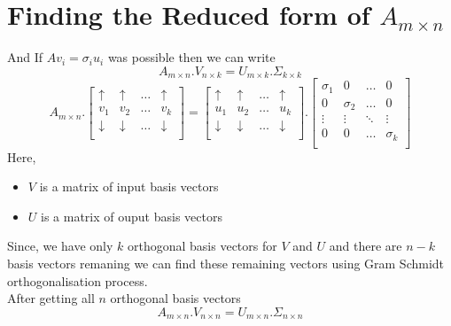 \documentclass{article}
\begin{document}
\section{Finding the Reduced form of $A_{m\times n}$}
And If $
  Av_i=\sigma_iu_i
$ was possible then we can write\\
$$
  A_{m \times n}.V_{n \times k}=U_{m\times k}.\Sigma_{k\times k}
$$
$$
  A_{m \times n}.\begin{bmatrix}
    \uparrow   & \uparrow   & \dots & \uparrow   \\
    v_1        & v_2        & \dots & v_k        \\
    \downarrow & \downarrow & \dots & \downarrow \\
  \end{bmatrix}=\begin{bmatrix}
    \uparrow   & \uparrow   & \dots & \uparrow   \\
    u_1        & u_2        & \dots & u_k        \\
    \downarrow & \downarrow & \dots & \downarrow \\
  \end{bmatrix}.\begin{bmatrix}
    \sigma_1 & 0        & \dots  & 0        \\
    0        & \sigma_2 & \dots  & 0        \\
    \vdots   & \vdots   & \ddots & \vdots   \\
    0        & 0        & \dots  & \sigma_k \\
  \end{bmatrix}
$$
Here,
\begin{itemize}
  \item $V$ is a matrix of input basis vectors
  \item $U$ is a matrix of ouput basis vectors
\end{itemize}
Since, we have only $k$ orthogonal basis vectors for $V$ and $U$ and there are $n-k$ basis vectors remaning we can find these remaining vectors using Gram Schmidt orthogonalisation process.\\
After getting all $n$ orthogonal basis vectors\\
$$
  A_{m \times n}.V_{n \times n}=U_{m\times n}.\Sigma_{n\times n}
$$
\end{document}
